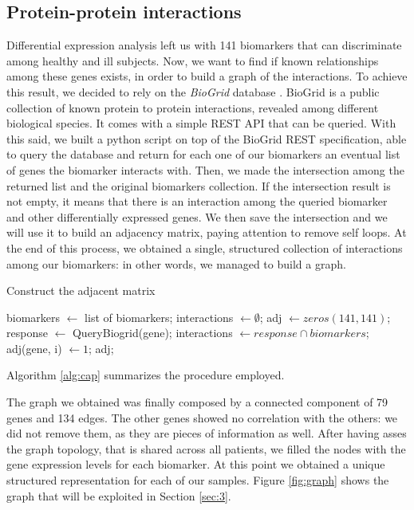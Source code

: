 \documentclass{article}
\begin{document}
\begin{multicols}{2}
\subsection{Protein-protein interactions}
Differential expression analysis left us with 141 biomarkers that can discriminate among healthy and ill subjects. Now, we want to find if known relationships among these genes exists, in order to build a graph of the interactions. To achieve this result, we decided to rely on the \textit{BioGrid} database \cite{biogrid}. BioGrid is a public collection of known protein to protein interactions, revealed among different biological species. It comes with a simple REST API that can be queried. With this said, we built a python script on top of the BioGrid REST specification, able to query the database and return for each one of our biomarkers an eventual list of genes the biomarker interacts with. Then, we made the intersection among the returned list and the original biomarkers collection. If the intersection result is not empty, it means that there is an interaction among the queried biomarker and other differentially expressed genes. We then save the intersection and we will use it to build an adjacency matrix, paying attention to remove self loops.
At the end of this process, we obtained a single, structured collection of interactions among our biomarkers: in other words, we managed to build a graph.
\begin{algorithm}[H]
\caption{Construct the adjacent matrix}\label{alg:cap}
\begin{algorithmic}
\State biomarkers $ \gets$ list of biomarkers;
\State interactions $ \gets \emptyset$;
\State adj $ \gets zeros(141, 141)$;
\State response $ \gets $ QueryBiogrid(gene);
\State interactions $ \gets response \cap {biomarkers}$;
\State adj(gene, i) $ \gets 1$;
\EndFor
\EndFor
\State \Return adj;
\end{algorithmic}
\end{algorithm}
 Algorithm \ref{alg:cap} summarizes the procedure employed.

\noindent
The graph we obtained was finally composed by a connected component of 79 genes and 134 edges. The other genes showed no correlation with the others: we did not remove them, as they are pieces of information as well.
After having asses the graph topology, that is shared across all patients, we filled the nodes with the gene expression levels for each biomarker. At this point we obtained a unique structured representation for each of our samples. Figure \ref{fig:graph} shows the graph that will be exploited in Section \ref{sec:3}. 


\end{multicols}
\end{document}
